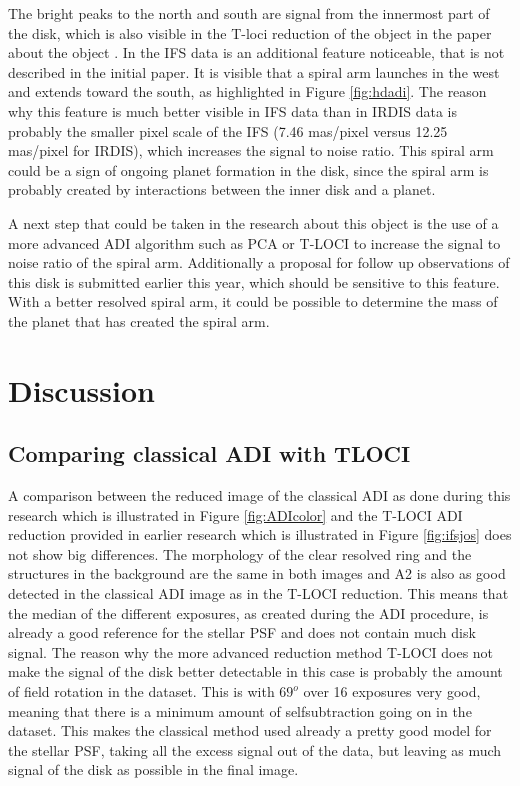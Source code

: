 \documentclass[twoside,single]{lion-msc}
\begin{document}
The bright peaks to the north and south are signal from the innermost part of the disk, which is also visible in the T-loci reduction of the object in the paper about the object \citep{Ginski2016}. In the IFS data is an additional feature noticeable, that is not described in the initial paper. It is visible that a spiral arm launches in the west and extends toward the south, as highlighted in Figure \ref{fig:hdadi}. The reason why this feature is much better visible in IFS data than in IRDIS data is probably the smaller pixel scale of the IFS (7.46 mas/pixel versus 12.25 mas/pixel for IRDIS), which increases the signal to noise ratio. This spiral arm could be a sign of ongoing planet formation in the disk, since the spiral arm is probably created by interactions between the inner disk and a planet.
\bigskip

A next step that could be taken in the research about this object is the use of a more advanced ADI algorithm such as PCA or T-LOCI to increase the signal to noise ratio of the spiral arm. Additionally a proposal for follow up observations of this disk is submitted earlier this year, which should be sensitive to this feature. With a better resolved spiral arm, it could be possible to determine the mass of the planet that has created the spiral arm.

\chapter{Discussion}
\section{Comparing classical ADI with TLOCI}
A comparison between the reduced image of the classical ADI as done during this research which is illustrated in Figure \ref{fig:ADIcolor} and the T-LOCI ADI reduction provided in earlier research which is illustrated in Figure \ref{fig:ifsjos} does not show big differences. The morphology of the clear resolved ring and the structures in the background are the same in both images and A2 is also as good detected in the classical ADI image as in the T-LOCI reduction. This means that the median of the different exposures, as created during the ADI procedure, is already a good reference for the stellar PSF and does not contain much disk signal. The reason why the more advanced reduction method T-LOCI does not make the signal of the disk better detectable in this case is probably the amount of field rotation in the dataset. This is with $69^o$ over 16 exposures very good, meaning that there is a minimum amount of selfsubtraction going on in the dataset. This makes the classical method used already a pretty good model for the stellar PSF, taking all the excess signal out of the data, but leaving as much signal of the disk as possible in the final image.  
\end{document}
